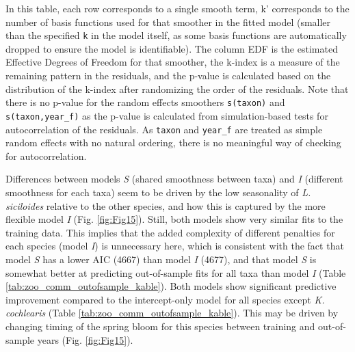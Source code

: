 \documentclass[12pt]{article}
\begin{document}
In this table, each row corresponds to a single smooth term, k'
corresponds to the number of basis functions used for that smoother in
the fitted model (smaller than the specified \texttt{k} in the model
itself, as some basis functions are automatically dropped to ensure the
model is identifiable). The column EDF is the estimated Effective
Degrees of Freedom for that smoother, the k-index is a measure of the
remaining pattern in the residuals, and the p-value is calculated based
on the distribution of the k-index after randomizing the order of the
residuals. Note that there is no p-value for the random effects
smoothers \texttt{s(taxon)} and \texttt{s(taxon,year\_f)} as the p-value
is calculated from simulation-based tests for autocorrelation of the
residuals. As \texttt{taxon} and \texttt{year\_f} are treated as simple
random effects with no natural ordering, there is no meaningful way of
checking for autocorrelation.

Differences between models \emph{S} (shared smoothness between taxa) and
\emph{I} (different smoothness for each taxa) seem to be driven by the
low seasonality of \emph{L. siciloides} relative to the other species,
and how this is captured by the more flexible model \emph{I} (Fig.
\ref{fig:Fig15}). Still, both models show very similar fits to the
training data. This implies that the added complexity of different
penalties for each species (model \emph{I}) is unnecessary here, which
is consistent with the fact that model \emph{S} has a lower AIC (4667)
than model \emph{I} (4677), and that model \emph{S} is somewhat better
at predicting out-of-sample fits for all taxa than model \emph{I} (Table
\ref{tab:zoo_comm_outofsample_kable}). Both models show significant
predictive improvement compared to the intercept-only model for all
species except \emph{K. cochlearis} (Table
\ref{tab:zoo_comm_outofsample_kable}). This may be driven by changing
timing of the spring bloom for this species between training and
out-of-sample years (Fig. \ref{fig:Fig15}).
\end{document}
